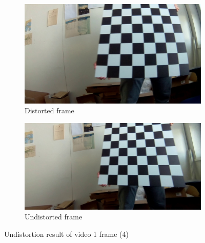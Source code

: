 \begin{figure}[h]
    \centering
    \begin{subfigure}[b]{0.48\textwidth}
        \centering
        \includegraphics[width=\textwidth]{figures/addl/img8_0.jpg}
        \caption{Distorted frame}
    \end{subfigure}
    \hfill
    \begin{subfigure}[b]{0.48\textwidth}
        \centering
        \includegraphics[width=\textwidth]{figures/addl/img8_5.jpg}
        \caption{Undistorted frame}
    \end{subfigure}
    \caption{Undistortion result of video 1 frame (4)}
    \label{fig:dist_1a4}
\end{figure}


